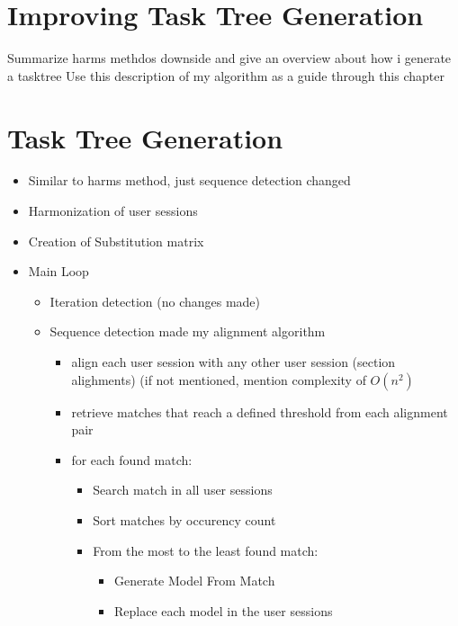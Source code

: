 \section{Improving Task Tree Generation}
Summarize harms methdos downside and give an overview about how i generate  a tasktree
Use this description of my algorithm as a guide through this chapter
\section{Task Tree Generation}
	\begin{itemize}
		\item Similar to harms method, just sequence detection changed
		\item Harmonization of user sessions
		\item Creation of Substitution matrix
		\item Main Loop
		\begin{itemize}
			\item Iteration detection (no changes made)
			\item Sequence detection made my alignment algorithm 

			\begin{itemize}
				\item align each user session with any other user session (section alighments)  (if not mentioned, mention complexity of $O(n^2)$
				\item retrieve matches that reach a defined threshold from each alignment pair
				\item for each found match:
				\begin{itemize}
					\item Search match in all user sessions
					\item Sort matches by occurency count
					\item From the most to the least found match:
					\begin{itemize}
						\item Generate Model From Match 
						\item Replace each model in the user sessions
					\end{itemize}
				\end{itemize}
			\end{itemize}
		\end{itemize}
	\end{itemize}

 

